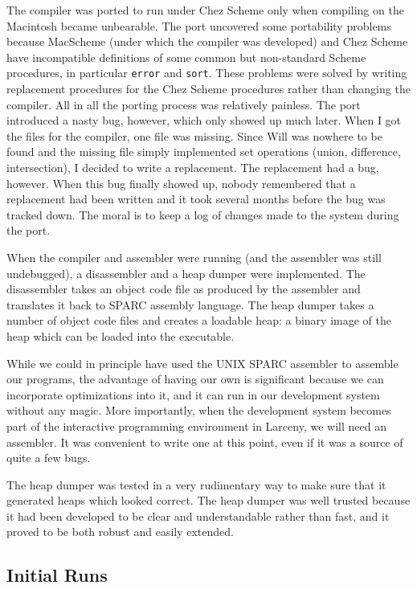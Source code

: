 The compiler was ported to run under Chez Scheme only when compiling on the
Macintosh became unbearable.  The port uncovered some portability problems
because MacScheme (under which the compiler was developed) and Chez Scheme
have incompatible definitions of some common but non-standard Scheme
procedures, in particular {\tt error} and {\tt sort}.  These problems were
solved by writing replacement procedures for the Chez Scheme procedures
rather than changing the compiler. All in all the porting process was
relatively painless. The port introduced a nasty bug, however, which only
showed up much later. When I got the files for the compiler, one file was
missing. Since Will was nowhere to be found and the missing file simply
implemented set operations (union, difference, intersection), I decided to
write a replacement. The replacement had a bug, however. When this bug
finally showed up, nobody remembered that a replacement had been written and
it took several months before the bug was tracked down.  The moral is to
keep a log of changes made to the system during the port.

When the compiler and assembler were running (and the assembler was still
undebugged), a disassembler and a heap dumper were implemented. The
disassembler takes an object code file as produced by the assembler and
translates it back to SPARC assembly language. The heap dumper takes a
number of object code files and creates a loadable heap: a binary image of
the heap which can be loaded into the executable.

While we could in principle have used the UNIX SPARC assembler to assemble
our programs, the advantage of having our own is significant because we can
incorporate optimizations into it, and it can run in our development system
without any magic. More importantly, when the development system becomes
part of the interactive programming environment in Larceny, we will need an
assembler. It was convenient to write one at this point, even if it was a
source of quite a few bugs.

The heap dumper was tested in a very rudimentary way to make sure that it
generated heaps which looked correct. The heap dumper was well trusted
because it had been developed to be clear and understandable rather than
fast, and it proved to be both robust and easily extended.

\subsection{Initial Runs}

